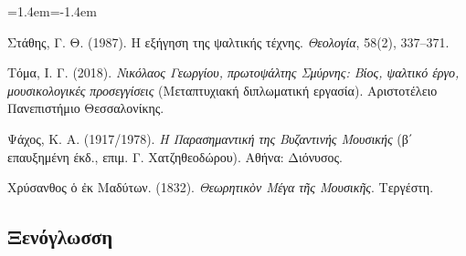 \documentclass[11pt,a4paper]{article}
\newenvironment{reflist}{\begin{list}{}{\leftmargin=1.4em\itemindent=-1.4em\itemsep=0.8pt\parsep=0pt}\small}{\end{list}}
\begin{document}
\begin{reflist}
\item Στάθης, Γ. Θ. (1987). Η εξήγηση της ψαλτικής τέχνης. \emph{Θεολογία}, 58(2), 337--371.
\item Τόμα, Ι. Γ. (2018). \emph{Νικόλαος Γεωργίου, πρωτοψάλτης Σμύρνης: Βίος, ψαλτικό έργο, μουσικολογικές προσεγγίσεις} (Μεταπτυχιακή διπλωματική εργασία). Αριστοτέλειο Πανεπιστήμιο Θεσσαλονίκης.
\item Ψάχος, Κ. Α. (1917/1978). \emph{Η Παρασημαντική της Βυζαντινής Μουσικής} (β΄ επαυξημένη έκδ., επιμ. Γ. Χατζηθεοδώρου). Αθήνα: Διόνυσος.
\item Χρύσανθος ὁ ἐκ Μαδύτων. (1832). \emph{Θεωρητικὸν Μέγα τῆς Μουσικῆς}. Τεργέστη.
\end{reflist}

\subsection*{Ξενόγλωσση}
\end{document}
